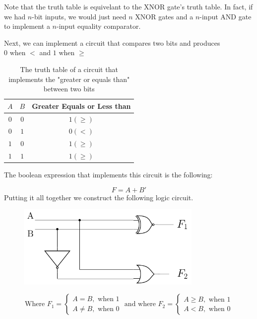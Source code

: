 Note that the truth table is equivelant to the XNOR gate's truth table. In fact, if we had $n$-bit inputs, we would just need
$n$ XNOR gates and a $n$-input AND gate to implement a $n$-input equality comparator.

Next, we can implement a circuit that compares two bits and produces $0\text{ when }<$ and $1\text{ when }\geq$

\begin{table}[ht]
    \centering
    \begin{tabular}{cc|c}
        $A$ & $B$ & Greater Equals or Less than \\
        \hline
        $0$ & $0$ & $1(\geq)$ \\
        $0$ & $1$ & $0(<)$ \\
        $1$ & $0$ & $1(\geq)$ \\
        $1$ & $1$ & $1(\geq)$ \\
    \end{tabular}
    \caption{The truth table of a circuit that implements the "greater or equals than" between two bits}
\end{table}

The boolean expression that implements this circuit is the following:

\begin{equation}
    F = A + B'
\end{equation}
Putting it all together we construct the following logic circuit.

\begin{figure}[ht]
    \centering
    \includegraphics[height=4cm]{images/5_Implementation/classical_1bit_comparator.pdf}
\end{figure}

\begin{equation}
    \text{Where }F_1 =
    \begin{cases}
        A = B, \text{ when }1 \\
        A \neq B, \text { when }0
    \end{cases}
    \text{ and where }
    F_2 =
    \begin{cases}
        A \geq B, \text{ when }1 \\
        A < B, \text{ when }0
    \end{cases}
\end{equation}

